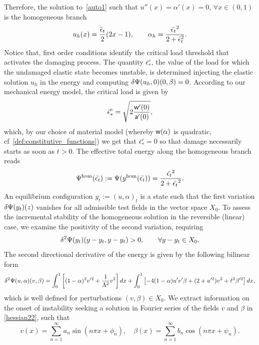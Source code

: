 \documentclass[10pt]{article}
\begin{document}
Therefore, the solution to~\eqref{auto1} such that $u''(x)=\alpha'(x)= 0, \, \forall x\in (0, 1)$ is the homogeneous branch
%
\begin{equation}
    u_h(x) =  \frac{\bar \epsilon_t}{2}(2x-1),\qquad\alpha_h = \frac{\Bar{\epsilon_t}^2}{2 + \Bar\epsilon_t^2}\label{eq:homo1}.
\end{equation}
Notice that,
first order conditions identify the critical load threshold that activates the damaging process. The quantity $\bar\epsilon_*^c$, the value of the load for which the undamaged elastic state becomes unstable, is determined injecting the elastic solution $u_h$ in the energy and computing $\delta \Psi(u_h, 0)(0, \beta)=0$.
According to our mechanical energy model, the critical load is given by
\begin{equation}
    {{{\bar{\epsilon}^c}_*}} = \sqrt{2\frac{\mathsf{w}'(0)}{\mathsf{a}'(0)}},
\end{equation}
%
%
which, by our choice of material model (whereby $\mathsf{w}(\alpha)$ is quadratic, cf~\eqref{def:constitutive_functions}) we get that $\bar{\epsilon}^c_*=0$ so that damage necessarily starts as soon as $t>0$.
The effective {total} energy along the {homogeneous} branch reads
\begin{equation}
    \label{eq:energy_homogeneous}
    \Psi^\text{hom}(\Bar{\epsilon_t}) :=\Psi(y^{\text{hom}}(\Bar{\epsilon_t})) = \frac{\Bar{\epsilon_t}^2}{2 + \Bar{\epsilon_t}^2}.
\end{equation}
An equilibrium configuration $y_t:=(u,\alpha)_t$ is a state such that the first variation $\delta \Psi(y_t)(z)$ vanishes for all admissible test fields in the vector space $X_0$.
To assess the incremental stability of the homogeneous solution in the reversible (linear) case, we examine the positivity of the second variation, requiring
\begin{equation}
    \delta^2 \Psi(y_t)(y-y_t, y-y_t)>0, \qquad  \forall {y-y_t}\in X_0,
    \label{eqn:linear_second_order_stability}
\end{equation}
{The second directional derivative of the energy is given by the following bilinear form}
\begin{equation}
    \delta^2 \Psi(u,\alpha)(v,\beta)=\int_0^1 \left[(1-\alpha)^2v'^2
        +\frac{1}{\Lambda^2} v^2 \right]dx
    +\int_0^1
    \left[ - 4(1-\alpha)u' v'\beta+(2+ u'^2)v^2+\ell^2\beta'^2 \right] dx,
    \label{hessian22}
\end{equation}
%
which is well defined for perturbations $(v, \beta)\in X_0$.
    {We} extract information on the onset of instability  seeking a solution in Fourier series of the fields $v$ and $\beta$ in \eqref{hessian22}, such that $$v(x)=\sum_{n=1}^{\infty} a_{n} \sin \left(n \pi x+\phi_{n}\right), \quad \beta(x)=\sum_{n=1}^{\infty} b_{n} \cos \left(n \pi x+\psi_{n}\right).$$
\end{document}
